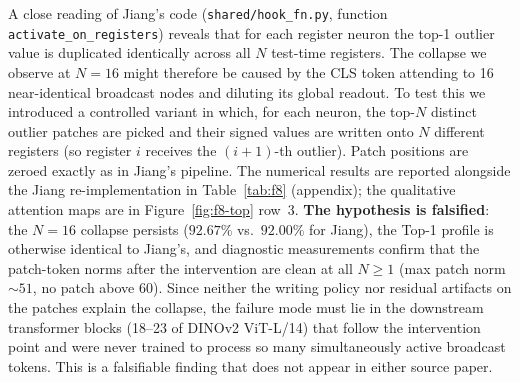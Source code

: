 
A close reading of Jiang's code (\texttt{shared/hook\_fn.py}, function \texttt{activate\_on\_registers}) reveals that for each register neuron the top-1 outlier value is duplicated identically across all $N$ test-time registers. The collapse we observe at $N=16$ might therefore be caused by the CLS token attending to 16 near-identical broadcast nodes and diluting its global readout. To test this we introduced a controlled variant in which, for each neuron, the top-$N$ distinct outlier patches are picked and their signed values are written onto $N$ different registers (so register $i$ receives the $(i{+}1)$-th outlier). Patch positions are zeroed exactly as in Jiang's pipeline. The numerical results are reported alongside the Jiang re-implementation in Table~\ref{tab:f8} (appendix); the qualitative attention maps are in Figure~\ref{fig:f8-top} row~3. \textbf{The hypothesis is falsified}: the $N=16$ collapse persists ($92.67\%$ vs.\ $92.00\%$ for Jiang), the Top-1 profile is otherwise identical to Jiang's, and diagnostic measurements confirm that the patch-token norms after the intervention are clean at all $N\geq 1$ (max patch norm $\sim 51$, no patch above $60$). Since neither the writing policy nor residual artifacts on the patches explain the collapse, the failure mode must lie in the downstream transformer blocks (18--23 of DINOv2 ViT-L/14) that follow the intervention point and were never trained to process so many simultaneously active broadcast tokens. This is a falsifiable finding that does not appear in either source paper.
